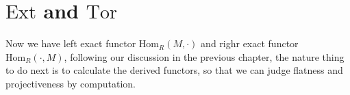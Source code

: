 \documentclass{note-eng}
\begin{document}
\section{$\mathrm{Ext}$ and $\mathrm{Tor}$}

Now we have left exact functor $\mathrm{Hom}_{R}(M, \cdot)$ and righr exact functor $\mathrm{Hom}_{R}(\cdot, M)$, following our discussion in the previous chapter, the nature thing to do next is to calculate the derived functors, so that we can judge flatness and projectiveness by computation.
\end{document}
